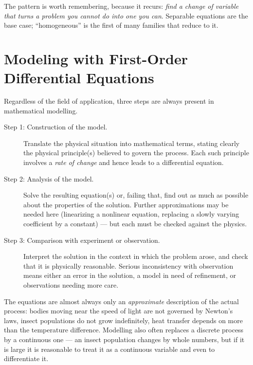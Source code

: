 \begin{moral}
	The pattern is worth remembering, because it recurs: \emph{find a change of variable
		that turns a problem you cannot do into one you can}. Separable equations are the
	base case; ``homogeneous'' is the first of many families that reduce to it.
\end{moral}

\section{Modeling with First-Order Differential Equations}


\begin{moral}
	Regardless of the field of application, three steps are always present in mathematical
	modelling.
	\begin{description}
		\item[Step 1: Construction of the model.] Translate the physical situation into
			mathematical terms, stating clearly the physical principle(s) believed to govern
			the process. Each such principle involves a \emph{rate of change} and hence leads
			to a differential equation.
		\item[Step 2: Analysis of the model.] Solve the resulting equation(s) or, failing
			that, find out as much as possible about the properties of the solution. Further
			approximations may be needed here (linearizing a nonlinear equation, replacing a
			slowly varying coefficient by a constant) --- but each must be checked against
			the physics.
		\item[Step 3: Comparison with experiment or observation.] Interpret the solution in
			the context in which the problem arose, and check that it is physically
			reasonable. Serious inconsistency with observation means either an error in the
			solution, a model in need of refinement, or observations needing more care.
	\end{description}
\end{moral}

\begin{remark}
	The equations are almost always only an \emph{approximate} description of the actual
	process: bodies moving near the speed of light are not governed by Newton's laws,
	insect populations do not grow indefinitely, heat transfer depends on more than the
	temperature difference. Modelling also often replaces a discrete process by a
	continuous one --- an insect population changes by whole numbers, but if it is large
	it is reasonable to treat it as a continuous variable and even to differentiate it.
\end{remark}

